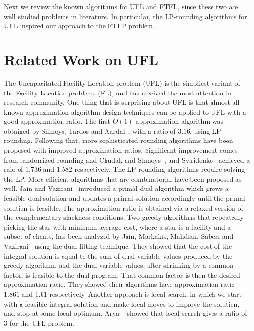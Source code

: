 \documentclass[oneside,final]{ucr}
\begin{document}
Next we review the known algorithms for UFL and FTFL, since
these two are well studied problems in literature. In
particular, the LP-rounding algorithms for UFL inspired our
approach to the FTFP problem.

\section{Related Work on UFL}
The Uncapacitated Facility Location problem (UFL) is the simpliest
variant of the Facility Location problems (FL), and has received the
most attention in research community. One thing that is surprising
about UFL is that almost all known approximation algorithm design
techniques can be applied to UFL with a good approximation ratio. The
first $O(1)$-approximation algorithm was obtained by Shmoys, Tardos
and Aardal~\cite{ShmoysTA97}, with a ratio of $3.16$, using
LP-rounding. Following that, more sophisticated rounding algorithms
have been proposed with improved approximation ratios. Significant
improvement comes from randomized rounding and Chudak and
Shmoys~\cite{ChudakS04}, and Sviridenko~\cite{Svi02} achieved a raio
of $1.736$ and $1.582$ respectively. The LP-rounding algorithms
require solving the LP. More efficient algorithms that are
combinatorial have been proposed as well. Jain and
Vazirani~\cite{JainV01} introduced a primal-dual algorithm which grows
a feasible dual solution and updates a primal solution accordingly
until the primal solution is feasible. The approximation ratio is
obtained via a relaxed version of the complementary slackness
conditions. Two greedy algorithms that repeatedly picking the star
with minimum average cost, where a star is a facility and a subset of
clients, has been analyzed by Jain, Markakis, Mahdian, Saberi and
Vazirani~\cite{JainMMSV03} using the dual-fitting technique. They
showed that the cost of the integral solution is equal to the sum of
dual variable values produced by the greedy algorithm, and the dual
variable values, after shrinking by a common factor, is feasible to
the dual program. That common factor is then the desired
approximation ratio. They showed their algorithms have approximation
ratio $1.861$ and $1.61$ respectively. Another approach is local
search, in which we start with a feasible integral solution and make
local moves to improve the solution, and stop at some local
optimum. Arya {\etal}~\cite{AryaGKMMP01} showed that local search
gives a ratio of $3$ for the UFL problem.
\end{document}

